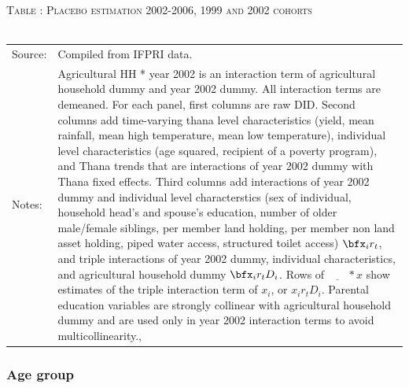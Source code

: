 \begin{table}\hfil\textsc{\footnotesize Table \thetable: Placebo estimation 2002-2006, 1999 and 2002 cohorts\label{zEm.1999.10.sameN}}\\\setlength{\tabcolsep}{.5pt}\renewcommand{\arraystretch}{.675}\hspace{-2em}\hfil\\\renewcommand{\arraystretch}{1}\hfil\begin{tabular}{>{\hfill\scriptsize}p{1cm}<{}>{\scriptsize}p{12cm}<{\hfill}} Source:& Compiled from IFPRI data. \\[-1ex] Notes:&   \textsf{Agricultural HH * year 2002} is an interaction term of agricultural household dummy and year 2002 dummy. All interaction terms are demeaned. For each panel, first columns are raw DID. Second columns add time-varying thana level characteristics (yield, mean rainfall, mean high temperature, mean low temperature), individual level characteristics (age squared, recipient of a poverty program), and \textsf{Thana trends} that are interactions of year 2002 dummy with Thana fixed effects. Third columns add interactions of year 2002 dummy and individual level characterstics (sex of individual, household head's and spouse's education, number of older male/female siblings, per member land holding, per member non land asset holding, piped water access, structured toilet access) $\bfx_{i}r_{t}$, and triple interactions of year 2002 dummy, individual characteristics, and agricultural household dummy $\bfx_{i}r_{t}D_{i}$. Rows of $\underline{\phantom{mm}}*x$ show estimates of the triple interaction term of $x_{i}$, or $x_{i}r_{t}D_{i}$. Parental education variables are strongly collinear with agricultural household dummy and are used only in year 2002 interaction terms to avoid multicollinearity., \\   \end{tabular} \end{table}


\subsubsection{Age group}

